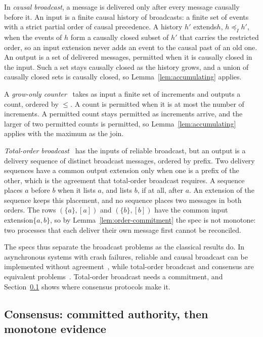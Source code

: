 \documentclass[sigconf]{cidr-2027}
\theoremstyle{remark}
\newcommand{\InputOrd}{\preceq_I}
\newcommand{\commitment}{commitment\xspace}
\newcommand{\inrel}{extends\xspace}          %
\newcommand{\indesc}{input extension\xspace} %
\newcommand{\outnoun}{output extension\xspace}%
\begin{document}
In \emph{causal broadcast}, a message is delivered only after every message
causally before it. An input is a finite causal history of broadcasts: a
finite set of events with a strict partial order of causal precedence. A
history $h'$ \inrel $h$, $h\InputOrd h'$, when the events of $h$ form a
causally closed subset of $h'$ that carries the restricted order, so an
\indesc never adds an event to the causal past of an old one. An output is a
set of delivered messages, permitted when it is causally closed in the input. Such a set stays causally closed as the history grows, and a union of causally
closed sets is causally closed, so Lemma~\ref{lem:accumulating} applies.

A \emph{grow-only counter}~\cite{shapiro2011crdt} takes as input a finite set
of increments and outputs a count, ordered by $\leq$. A count is permitted
when it is at most the number of increments. A permitted count stays
permitted as increments arrive, and the larger of two permitted counts is
permitted, so Lemma~\ref{lem:accumulating} applies with the maximum as the join.

\emph{Total-order broadcast}~\cite{defago2004total} has the inputs of reliable
broadcast, but an output is a delivery sequence of distinct broadcast
messages, ordered by prefix. Two delivery sequences have a common \outnoun
only when one is a prefix of the other, which is the agreement that
total-order broadcast requires. A sequence places $a$ before $b$ when it lists
$a$, and lists $b$, if at all, after $a$. An extension of the sequence keeps
this placement, and no sequence places two messages in both orders. The rows
$(\{a\},[a])$ and $(\{b\},[b])$ have the common \indesc $\{a,b\}$, so by
Lemma~\ref{lem:order-commitment} the spec is not monotone: two processes that
each deliver their own message first cannot be reconciled.

The specs thus separate the broadcast problems as the classical results do. In asynchronous systems with crash failures, reliable and causal broadcast can
be implemented without agreement~\cite{hadzilacos1994modular}, while
total-order broadcast and consensus are equivalent
problems~\cite{chandra1996unreliable}. Total-order broadcast needs a
\commitment, and Section~\ref{app:consensus} shows where consensus protocols
make it.

\subsection{Consensus: committed authority, then monotone evidence}
\label{app:consensus}
\end{document}

